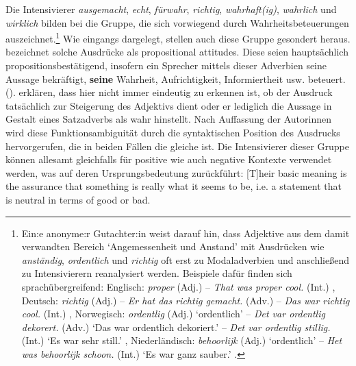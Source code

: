 
Die Intensivierer \textit{ausgemacht}, \textit{echt}, \textit{fürwahr}, \textit{richtig}, \textit{wahrhaft(ig)}, \textit{wahrlich} und \textit{wirklich} bilden bei \citet[357]{Claudi.2006} die Gruppe, die sich vorwiegend durch Wahrheitsbeteuerungen auszeichnet.\footnote{Ein:e anonyme:r Gutachter:in weist darauf hin, dass Adjektive aus dem damit verwandten Bereich `Angemessenheit und Anstand' mit Ausdrücken wie \textit{anständig}, \textit{ordentlich} und \textit{richtig} oft erst zu Modaladverbien und anschließend zu Intensivierern reanalysiert werden. Beispiele dafür finden sich sprachübergreifend: Englisch: \textit{proper} (Adj.) -- \textit{That was proper cool.} (Int.) \citep[vgl.][206]{Stratton.2021}, Deutsch: \textit{richtig} (Adj.) -- \textit{Er hat das richtig gemacht.} (Adv.) -- \textit{Das war richtig cool.} (Int.) \citep[vgl.][186]{Stratton.2020b}, Norwegisch: \textit{ordentlig} (Adj.) `ordentlich' -- \textit{Det var ordentlig dekorert.} (Adv.) `Das war ordentlich dekoriert.' -- \textit{Det var ordentlig stillig.} (Int.) `Es war sehr still.' \citep[vgl.][411]{Stratton.2022}, Niederländisch: \textit{behoorlijk} (Adj.) `ordentlich' -- \textit{Het was behoorlijk schoon.} (Int.) `Es war ganz sauber.' {\citep[vgl.][411]{Stratton.2022}}.} Wie eingangs dargelegt, stellen auch \citet[302]{Heine.2002a} diese Gruppe gesondert heraus. {\citet[109]{Os.1989}} bezeichnet solche Ausdrücke als \glqq{}propositional attitudes\grqq{}. Diese seien hauptsächlich propositionsbestätigend, insofern \glqq{}ein Sprecher mittels dieser Adverbien seine Aussage bekräftigt, {\textbf{seine}} Wahrheit, Aufrichtigkeit, Informiertheit usw. beteuert.\grqq{} (\citealt[85]{Os.1989}). {\citet[8f.]{Pittner.2006}} erklären, dass hier nicht immer eindeutig zu erkennen ist, ob der Ausdruck tatsächlich zur Steigerung des Adjektivs dient oder er lediglich die Aussage in Gestalt eines Satzadverbs als wahr hinstellt. Nach Auffassung der Autorinnen wird diese Funktionsambiguität durch die syntaktischen Position des Ausdrucks hervorgerufen, die in beiden Fällen die gleiche ist. Die Intensivierer dieser Gruppe können allesamt gleichfalls für positive wie auch negative Kontexte verwendet werden, was \citet[358]{Claudi.2006} auf deren Ursprungsbedeutung zurückführt: \glqq{}[T]heir basic meaning is the assurance that something is really what it seems to be, i.e. a statement that is neutral in
terms of good or bad\grqq{}.


